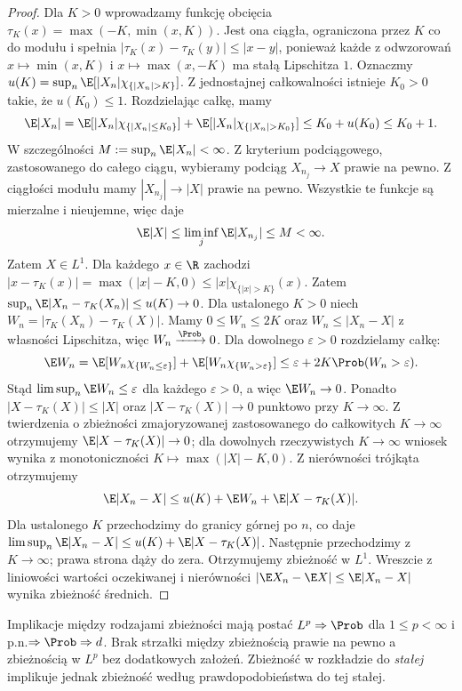 \begin{proof}
Dla $K>0$ wprowadzamy funkcję obcięcia
$\tau_K(x)=\max(-K,\min(x,K))$.
Jest ona ciągła, ograniczona przez $K$ co do modułu
i spełnia $|\tau_K(x)-\tau_K(y)|\leq|x-y|$,
ponieważ każde z odwzorowań $x\mapsto\min(x,K)$
i $x\mapsto\max(x,-K)$ ma stałą Lipschitza $1$.
Oznaczmy
$u(K)=\sup_n\E[|X_n|\chi_{\{|X_n|>K\}}]$.
Z jednostajnej całkowalności istnieje $K_0>0$
takie, że $u(K_0)\leq1$. Rozdzielając całkę, mamy
\[
\E|X_n|
=\E[|X_n|\chi_{\{|X_n|\leq K_0\}}]
 +\E[|X_n|\chi_{\{|X_n|>K_0\}}]
\leq K_0+u(K_0)\leq K_0+1.
\]
W szczególności $M:=\sup_n\E|X_n|<\infty$.
Z kryterium podciągowego, zastosowanego do całego
ciągu, wybieramy podciąg $X_{n_j}\to X$ prawie na pewno.
Z ciągłości modułu mamy $|X_{n_j}|\to|X|$ prawie na pewno.
Wszystkie te funkcje są mierzalne i nieujemne, więc
 daje
\[
\E|X|\leq\liminf_j\E|X_{n_j}|\leq M<\infty.
\]
Zatem $X\in L^1$.
Dla każdego $x\in\R$ zachodzi
$|x-\tau_K(x)|=\max(|x|-K,0)\leq
|x|\chi_{\{|x|>K\}}(x)$.
Zatem $\sup_n\E|X_n-\tau_K(X_n)|\leq u(K)\to0$.
Dla ustalonego $K>0$ niech
$W_n=|\tau_K(X_n)-\tau_K(X)|$.
Mamy $0\leq W_n\leq2K$ oraz $W_n\leq|X_n-X|$
z własności Lipschitza, więc $W_n\xrightarrow{\Prob}0$.
Dla dowolnego $\varepsilon>0$ rozdzielamy całkę:
\[
\E W_n=\E[W_n\chi_{\{W_n\leq\varepsilon\}}]
+\E[W_n\chi_{\{W_n>\varepsilon\}}]
\leq\varepsilon+2K\Prob(W_n>\varepsilon).
\]
Stąd $\limsup_n\E W_n\leq\varepsilon$ dla każdego
$\varepsilon>0$, a więc $\E W_n\to0$.
Ponadto $|X-\tau_K(X)|\leq |X|$ oraz
$|X-\tau_K(X)|\to0$ punktowo przy $K\to\infty$.
Z twierdzenia o zbieżności zmajoryzowanej zastosowanego
do całkowitych $K\to\infty$ otrzymujemy
$\E|X-\tau_K(X)|\to0$; dla dowolnych rzeczywistych
$K\to\infty$ wniosek wynika z monotoniczności
$K\mapsto\max(|X|-K,0)$.
Z nierówności trójkąta otrzymujemy
\[
\E|X_n-X|\leq u(K)+\E W_n+\E|X-\tau_K(X)|.
\]
Dla ustalonego $K$ przechodzimy do granicy górnej
po $n$, co daje
$\limsup_n\E|X_n-X|\leq u(K)+\E|X-\tau_K(X)|$.
Następnie przechodzimy z $K\to\infty$; prawa strona
dąży do zera. Otrzymujemy zbieżność w $L^1$.
Wreszcie z liniowości wartości oczekiwanej i nierówności
$|\E X_n-\E X|\leq\E|X_n-X|$ wynika zbieżność średnich.
\end{proof}

\begin{uwaga}
Implikacje między rodzajami zbieżności mają postać
$L^p\Rightarrow\Prob$ dla $1\leq p<\infty$
i p.n.$\Rightarrow\Prob\Rightarrow d$. Brak strzałki między zbieżnością
prawie na pewno a zbieżnością w $L^p$ bez dodatkowych
założeń. Zbieżność w rozkładzie do \emph{stałej}
implikuje jednak zbieżność według prawdopodobieństwa
do tej stałej.
\end{uwaga}

